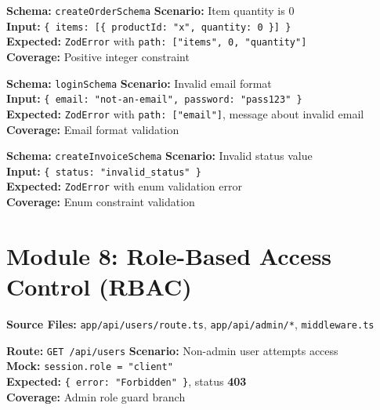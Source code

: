 ﻿\documentclass[12pt,a4paper]{report}
\newcommand{\pone}{\textbf{\color{p1red}P1}}
\newcommand{\ptwo}{\textbf{\color{p2orange}P2}}
\newcommand{\pthree}{\textbf{\color{p3blue}P3}}
\begin{document}
\begin{tcolorbox}[testbox,title={ZOD-004 \hfill \ptwo}]
\textbf{Schema:} \texttt{createOrderSchema} \quad \textbf{Scenario:} Item quantity is 0 \\
\textbf{Input:} \texttt{\{ items: [\{ productId: "x", quantity: 0 \}] \}} \\
\textbf{Expected:} \texttt{ZodError} with \texttt{path: ["items", 0, "quantity"]} \\
\textbf{Coverage:} Positive integer constraint
\end{tcolorbox}

\begin{tcolorbox}[testbox,title={ZOD-005 \hfill \pthree}]
\textbf{Schema:} \texttt{loginSchema} \quad \textbf{Scenario:} Invalid email format \\
\textbf{Input:} \texttt{\{ email: "not-an-email", password: "pass123" \}} \\
\textbf{Expected:} \texttt{ZodError} with \texttt{path: ["email"]}, message about invalid email \\
\textbf{Coverage:} Email format validation
\end{tcolorbox}

\begin{tcolorbox}[testbox,title={ZOD-006 \hfill \pthree}]
\textbf{Schema:} \texttt{createInvoiceSchema} \quad \textbf{Scenario:} Invalid status value \\
\textbf{Input:} \texttt{\{ status: "invalid\_status" \}} \\
\textbf{Expected:} \texttt{ZodError} with enum validation error \\
\textbf{Coverage:} Enum constraint validation
\end{tcolorbox}

\section{Module 8: Role-Based Access Control (RBAC)}

\textbf{Source Files:} \texttt{app/api/users/route.ts}, \texttt{app/api/admin/*}, \texttt{middleware.ts}

\begin{tcolorbox}[criticalbox,title={RBAC-001 \hfill \pone\ --- Admin-Only Endpoint}]
\textbf{Route:} \texttt{GET /api/users} \quad \textbf{Scenario:} Non-admin user attempts access \\
\textbf{Mock:} \texttt{session.role = "client"} \\
\textbf{Expected:} \texttt{\{ error: "Forbidden" \}}, status \textbf{403} \\
\textbf{Coverage:} Admin role guard branch
\end{tcolorbox}
\end{document}
